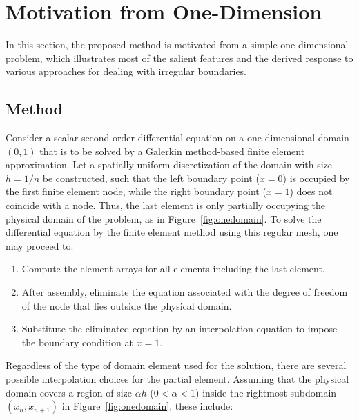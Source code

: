 \documentclass[12pt,twoside]{article}
\begin{document}
\newpage
\section{Motivation from One-Dimension}\label{sec:oned}
\par
In this section, the proposed method is motivated from a simple one-dimensional 
problem, which illustrates most of the salient features and the derived 
response to various approaches for dealing with irregular boundaries. 
\subsection{Method}\label{sec:methods1d}
\par
Consider a scalar second-order differential equation on a one-dimensional 
domain $(0,1)$ that is to be solved by a Galerkin method-based finite element 
approximation. Let a spatially uniform discretization of the domain with size 
$h=1/n$ be constructed, such that the left boundary point ($x=0$) is occupied 
by the first finite element node, while the right boundary point 
($x=1$) does not coincide with a node. Thus, the last element is only partially 
occupying the physical domain of the problem, as in Figure~\ref{fig:onedomain}. 
To solve the differential equation by the finite element method using this 
regular mesh, one may proceed to: 
\begin{enumerate}
\item Compute the element arrays for all elements including the last element. 
\item After assembly, eliminate the equation associated with the degree 
of freedom of the node that lies outside the physical domain. 
\item Substitute the eliminated equation by an interpolation equation to 
impose the boundary condition at $x=1$. 
\end{enumerate}
Regardless of the type of domain element used for the solution, there are 
several possible interpolation choices for the partial element. Assuming that 
the physical domain covers a region of size $\alpha h$ 
($0<\alpha<1$) inside the rightmost subdomain $(x_n,x_{n+1})$ 
in Figure~\ref{fig:onedomain}, these include: 
\end{document}
